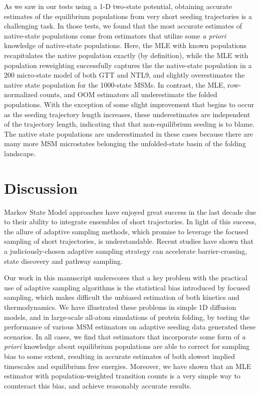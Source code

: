 \documentclass[%
 aip,
rsi,%
 amsmath,amssymb,
 reprint,%
]{revtex4-1}
\begin{document}
As we saw in our tests using a 1-D two-state potential, obtaining accurate estimates of the equilibrium populations from very short seeding trajectories is a challenging task.  In those tests, we found that the most accurate estimates of native-state populations come from estimators that utilize some \textit{a priori} knowledge of native-state populations. Here, the MLE with known populations recapitulates the native population exactly (by definition), while the MLE with population reweighting successfully captures the the native-state population in a 200 micro-state model of both GTT and NTL9, and slightly overestimates the native state population for the 1000-state MSMs. In contrast, the MLE, row-normalized counts, and OOM estimators all underestimate the folded populations.  With the exception of some slight improvement that begins to occur as the seeding trajectory length increases, these underestimates are independent of the trajectory length, indicating that that non-equilibrium seeding is to blame.  The native state populations are underestimated in these cases because there are many more MSM microstates belonging the unfolded-state basin of the folding landscape.



\section*{Discussion}

Markov State Model approaches have enjoyed great success in the last decade due to their ability to integrate ensembles of short trajectories.  In light of this success, the allure of adaptive sampling methods, which promise to leverage the focused sampling of short trajectories, is understandable.  Recent studies have shown that a judiciously-chosen adaptive sampling strategy can accelerate barrier-crossing, state discovery and pathway sampling.\cite{Hruska:2018ec,Zimmerman:2018jn}

Our work in this manuscript underscores that a key problem with the practical use of adaptive sampling algorithms is the statistical bias introduced by focused sampling, which makes difficult the unbiased estimation of both kinetics and thermodynamics. We have illustrated these problems in simple 1D diffusion models, and in large-scale all-atom simulations of protein folding, by testing the performance of various MSM estimators on adaptive seeding data generated these scenarios. In all cases, we find that estimators that incorporate some form of \textit{a priori} knowledge about equilibrium populations are able to correct for sampling bias to some extent, resulting in accurate estimates of both slowest implied timescales and equilibrium free energies.  Moreover, we have shown that an MLE estimator with population-weighted transition counts is a very simple way to counteract this bias, and achieve reasonably accurate results.
\end{document}
